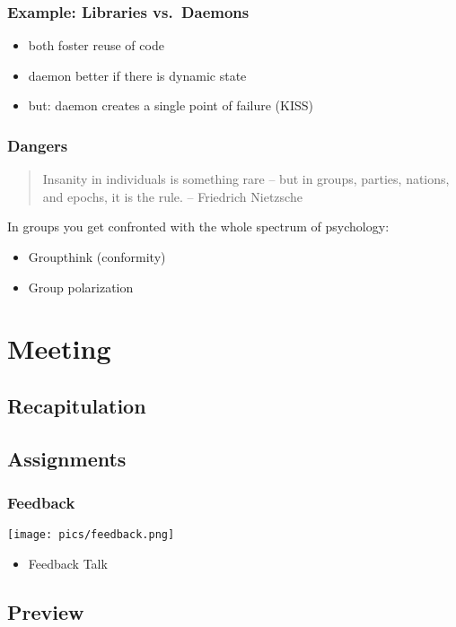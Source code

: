 \begin{frame}
	\frametitle{Example: Libraries vs.\ Daemons}

	\begin{itemize}[<+-| alert@+>]
	\item both foster reuse of code
	\item daemon better if there is dynamic state
	\item but: daemon creates a single point of failure (KISS)
	\end{itemize}
\end{frame}

\begin{frame}
	\frametitle{Dangers}

	\begin{quote}
	Insanity in individuals is something rare -- but in groups, parties, nations, and epochs, it is the rule.
	-- Friedrich Nietzsche
	\end{quote}

	In groups you get confronted with the whole spectrum of psychology:

	\pause

	\begin{itemize}[<+-| alert@+>]
	\item Groupthink (conformity)
	\item Group polarization
	\end{itemize}
\end{frame}



\section{Meeting}

\subsection{Recapitulation}
\subsection{Assignments}

\begin{frame}
	\frametitle{Feedback}

	\hfill \texttt{[image: pics/feedback.png]}
	\vspace{-1cm}
	\begin{itemize}
		\item Feedback Talk
	\end{itemize}
\end{frame}

\subsection{Preview}

\appendix

\begin{frame}[allowframebreaks]
	
	
\end{frame}



